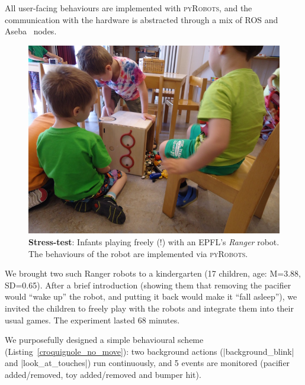 \documentclass[a4paper, 10pt, conference]{ieeeconf}      %
\newcommand{\pyRobots}{\textsc{pyRobots}}
\begin{document}
All user-facing behaviours are implemented with \pyRobots{},
and the communication with the hardware is abstracted through a mix of ROS
and Aseba~\cite{magnenat2011aseba} nodes.

\begin{figure}
        \centering
        \includegraphics[width=0.9\columnwidth]{ranger-side}
        \caption{\textbf{Stress-test}: Infants playing freely (!) with an EPFL's \emph{Ranger} robot.
        The behaviours of the robot are implemented via \pyRobots{}.}
        \label{expe-nursery}
\end{figure}

We brought two such Ranger robots to a kindergarten (17 children, age: M=3.88,
SD=0.65). After a brief introduction (showing them that removing the pacifier
would ``wake up'' the robot, and putting it back would make it ``fall asleep''),
we invited the children to freely play with the robots and integrate them into
their usual games. The experiment lasted 68 minutes.

We purposefully designed a simple behavioural scheme
(Listing~\ref{croquignole_no_move}): two background actions
(\python|background_blink| and \python|look_at_touches|) run continuously, and 5
events are monitored (pacifier added/removed, toy added/removed and bumper hit).
\end{document}
